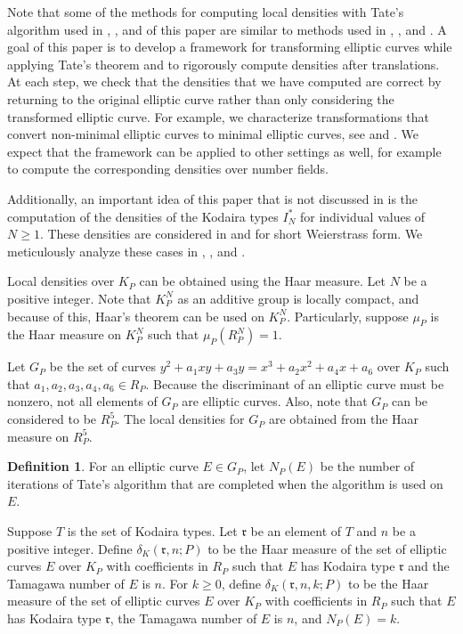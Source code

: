 \documentclass[12pt,letterpaper]{amsart}
\theoremstyle{definition}
\newtheorem{definition}[theorem]{Definition}
\begin{document}
Note that some of the methods for computing local densities with Tate's algorithm used in , , and  of this paper are similar to methods used in \cite{ProdNF}, \cite{localglobal}, and \cite{ProdRationals}. A goal of this paper is to develop a framework for transforming elliptic curves while applying Tate's theorem and to rigorously compute densities after translations. At each step, we check that the densities that we have computed are correct by returning to the original elliptic curve rather than only considering the transformed elliptic curve. For example, we characterize transformations that convert non-minimal elliptic curves to minimal elliptic curves, see  and . We expect that the framework can be applied to other settings as well, for example to compute the corresponding densities over number fields.

Additionally, an important idea of this paper that is not discussed in \cite{localglobal} is the computation of the densities of the Kodaira types $I_N^*$ for individual values of $N\geq 1$. These densities are considered in \cite{ProdNF} and \cite{ProdRationals} for short Weierstrass form. We meticulously analyze these cases in , , and .

Local densities over $K_P$ can be obtained using the Haar measure. Let $N$ be a positive integer. Note that $K_P^N$ as an additive group is locally compact, and because of this, Haar's theorem can be used on $K_P^N$. Particularly, suppose $\mu_P$ is the Haar measure on $K_P^N$ such that $\mu_P(R_P^N)=1$. 

Let $G_P$ be the set of curves $y^2+a_1xy+a_3y=x^3+a_2x^2+a_4x+a_6$ over $K_P$ such that $a_1,a_2,a_3,a_4,a_6\in R_P$. Because the discriminant of an elliptic curve must be nonzero, not all elements of $G_P$ are elliptic curves. Also, note that $G_P$ can be considered to be $R_P^5$. The local densities for $G_P$ are obtained from the Haar measure on $R_P^5$. 

\begin{definition}
\label{def:numiter}
For an elliptic curve $E\in G_P$, let $N_P(E)$ be the number of iterations of Tate's algorithm that are completed when the algorithm is used on $E$.
\end{definition}

Suppose $T$ is the set of Kodaira types. Let $\mathfrak{r}$ be an element of $T$ and $n$ be a positive integer. Define $\delta_K(\mathfrak{r},n;P)$ to be the Haar measure of the set of elliptic curves $E$ over $K_P$ with coefficients in $R_P$ such that $E$ has Kodaira type $\mathfrak{r}$ and the Tamagawa number of $E$ is $n$. For $k\geq 0$, define $\delta_K(\mathfrak{r},n,k;P)$ to be the Haar measure of the set of elliptic curves $E$ over $K_P$ with coefficients in $R_P$ such that $E$ has Kodaira type $\mathfrak{r}$, the Tamagawa number of $E$ is $n$, and $N_P(E)=k$.
\end{document}
